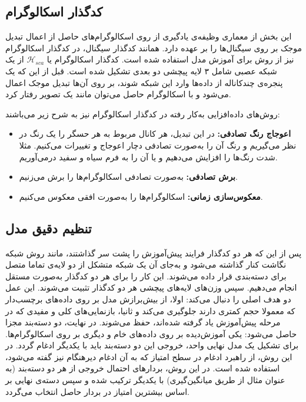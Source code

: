 \subsection{کدگذار اسکالوگرام}

این بخش از معماری وظیفه‌ی یادگیری از روی اسکالوگرام‌های حاصل از اعمال تبدیل موجک بر روی سیگنال‌ها را بر عهده دارد. همانند کدگذار سیگنال، در کدگذار اسکالوگرام نیز از روش 
برای آموزش مدل استفاده شده است. کدگذار اسکالوگرام یا
$\mathcal{H}_{sca}$
از یک شبکه عصبی شامل ۳ لایه پیچشی دو بعدی تشکیل شده است. قبل از این که یک پنجره‌ی چندکاناله از داده‌ها وارد این شبکه شوند، بر روی آن‌ها تبدیل موجک اعمال می‌شود و با اسکالوگرام حاصل می‌توان مانند یک تصویر رفتار کرد.

روش‌های داده‌افزایی به‌کار رفته در کدگذار اسکالوگرام نیز به شرح زیر می‌باشند:
\begin{itemize}
    \item\textbf{اعوجاج رنگ تصادفی:}
    در این تبدیل، هر کانال مربوط به هر حسگر را یک رنگ در نظر می‌گیریم و رنگ آن را به‌صورت تصادفی دچار اعوجاج و تغییرات می‌کنیم. مثلا شدت رنگ‌ها را افزایش می‌دهیم و یا آن را به فرم سیاه و سفید درمی‌آوریم.
    \item\textbf{برش تصادفی:}
    به‌صورت تصادفی اسکالوگرام‌ها را برش می‌زنیم.
    \item\textbf{معکوس‌سازی زمانی:}
    اسکالوگرام‌ها را به‌صورت افقی معکوس می‌کنیم.
\end{itemize}

\subsection{تنظیم دقیق مدل}

پس از این که هر دو کدگذار فرایند پیش‌آموزش را پشت سر گذاشتند، مانند روش 
شبکه نگاشت کنار گذاشته می‌شود و به‌جای آن یک شبکه متشکل از دو لایه‌ی تماما متصل برای دسته‌بندی قرار داده می‌شوند. این کار را برای هر دو کدگذار به‌صورت مستقل انجام می‌دهیم. سپس وزن‌های لایه‌های پیچشی هر دو کدگذار تثبیت می‌شوند. این عمل دو هدف اصلی را دنبال می‌کند: اولا، از بیش‌برازش مدل بر روی داده‌های برچسب‌دار که معمولا حجم کمتری دارند جلوگیری می‌کند و ثانیا، بازنمایی‌های کلی و مفیدی که در مرحله پیش‌آموزش یاد گرفته شده‌اند، حفظ می‌شوند. در نهایت، دو دسته‌بند مجزا حاصل می‌شود: یکی آموزش‌دیده بر روی داده‌های خام و دیگری بر روی اسکالوگرام‌ها. برای تشکیل یک مدل نهایی واحد، خروجی این دو دسته‌بند باید با یکدیگر ادغام گردد. در این روش، از راهبرد
ادغام در سطح امتیاز
که به آن
ادغام دیرهنگام
نیز گفته می‌شود، استفاده شده است. در این روش، بردارهای احتمال خروجی از هر دو دسته‌بند (به عنوان مثال از طریق میانگین‌گیری) با یکدیگر ترکیب شده و سپس دسته‌ی نهایی بر اساس بیشترین امتیاز در بردار حاصل انتخاب می‌گردد.

